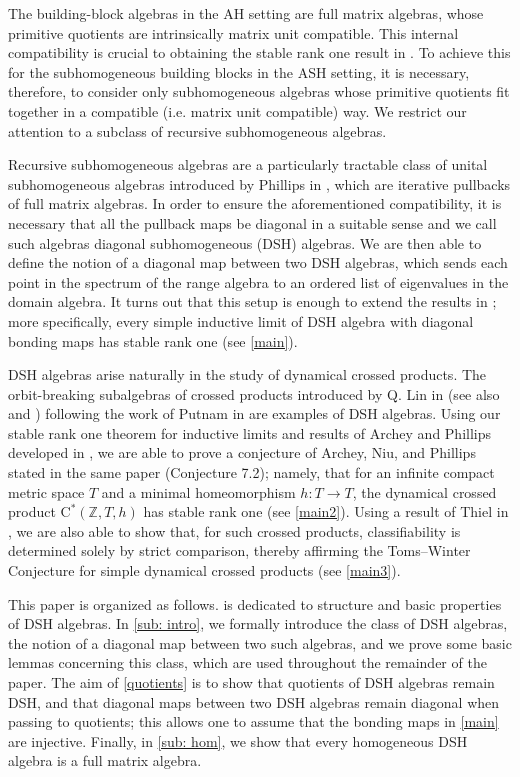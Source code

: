 \documentclass[12pt]{amsart}
\numberwithin{equation}{section}
\theoremstyle{definition}
\theoremstyle{remark}
\begin{document}
The building-block algebras in the AH setting are full matrix algebras, whose primitive quotients are intrinsically matrix unit compatible. This internal compatibility is crucial to obtaining the stable rank one result in \cite{EHT}. To achieve this for the subhomogeneous building blocks in the ASH setting, it is necessary, therefore, to consider only subhomogeneous algebras whose primitive quotients fit together in a compatible (i.e. matrix unit compatible) way. We restrict our attention to a subclass of recursive subhomogeneous algebras.

Recursive subhomogeneous algebras are a particularly tractable class of unital subhomogeneous algebras introduced by Phillips in \cite{phil}, which are iterative pullbacks of full matrix algebras. In order to ensure the aforementioned compatibility, it is necessary that all the pullback maps be diagonal in a suitable sense and we call such algebras diagonal subhomogeneous (DSH) algebras. We are then able to define the notion of a diagonal map between two DSH algebras, which sends each point in the spectrum of the range algebra to an ordered list of eigenvalues in the domain algebra. It turns out that this setup is enough to extend the results in \cite{EHT}; more specifically, every simple inductive limit of DSH algebra with diagonal bonding maps has stable rank one (see \autoref{main}). 

DSH algebras arise naturally in the study of dynamical crossed products. The orbit-breaking subalgebras of crossed products introduced by Q. Lin in \cite{Lin} (see also \cite{LP} and \cite{LP2}) following the work of Putnam in \cite{Put} are examples of DSH algebras. Using our stable rank one theorem for inductive limits and results of Archey and Phillips developed in \cite{arcphil}, we are able to prove a conjecture of Archey, Niu, and Phillips stated in the same paper (Conjecture 7.2); namely, that for an infinite compact metric space $T$ and a minimal homeomorphism $h\colon T\to T$, the dynamical crossed product $\mathrm{C^*}(\mathbb{Z},T,h)$ has stable rank one (see \autoref{main2}). Using a result of Thiel in \cite{thi}, we are also able to show that, for such crossed products, classifiability is determined solely by strict comparison, thereby affirming the Toms--Winter Conjecture for simple dynamical crossed products (see \autoref{main3}).  

This paper is organized as follows.  is dedicated to structure and basic properties of DSH algebras. In \cref{sub: intro}, we formally introduce the class of DSH algebras, the notion of a diagonal map between two such algebras, and we prove some basic lemmas concerning this class, which are used throughout the remainder of the paper. The aim of \cref{quotients} is to show that quotients of DSH algebras remain DSH, and that diagonal maps between two DSH algebras remain diagonal when passing to quotients; this allows one to assume that the bonding maps in \autoref{main} are injective. Finally, in \cref{sub: hom}, we show that every homogeneous DSH algebra is a full matrix algebra. 
\end{document}
